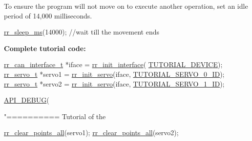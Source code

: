 \begin{DoxyEnumerate}
\item To ensure the program will not move on to execute another operation, set an idle period of 14,000 milliseconds. 
\begin{DoxyCodeInclude}
    \hyperlink{group___aux_gaeb26028b83635e028ebc901e1cbf33a1}{rr\_sleep\_ms}(14000); \textcolor{comment}{//wait till the movement ends}
\end{DoxyCodeInclude}
 {\bfseries  Complete tutorial code\+: } 
\begin{DoxyCodeInclude}
    \hyperlink{structrr__can__interface__t}{rr\_can\_interface\_t} *iface = \hyperlink{group___init_ga472a4890dcc7d7a13123c56a06946d91}{rr\_init\_interface}(
      \hyperlink{tutorial_8h_a90947332a0345dc693905e3fc04dbeb2}{TUTORIAL\_DEVICE});
    \hyperlink{structrr__servo__t}{rr\_servo\_t} *servo1 = \hyperlink{group___init_ga0adb313a3eeb8a4399431e940a1f3e9e}{rr\_init\_servo}(iface, 
      \hyperlink{tutorial_8h_a9a3d33f25d3a72a8e30c885d238b3b65}{TUTORIAL\_SERVO\_0\_ID});
    \hyperlink{structrr__servo__t}{rr\_servo\_t} *servo2 = \hyperlink{group___init_ga0adb313a3eeb8a4399431e940a1f3e9e}{rr\_init\_servo}(iface, 
      \hyperlink{tutorial_8h_a525a6de936d69ba937949199d94ab568}{TUTORIAL\_SERVO\_1\_ID});

    \hyperlink{api_8h_a0e4aafa2ca9bd25219713176906b7c40}{API\_DEBUG}(\textcolor{stringliteral}{"========== Tutorial of the %

    \hyperlink{group___trajectory_ga19472cd90ae91f9b9f49edf4f52f35a2}{rr\_clear\_points\_all}(servo1);
    \hyperlink{group___trajectory_ga19472cd90ae91f9b9f49edf4f52f35a2}{rr\_clear\_points\_all}(servo2);

}
\end{DoxyCodeInclude}
\end{DoxyEnumerate}
